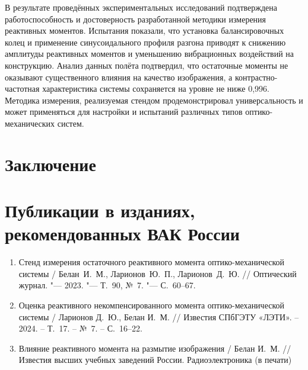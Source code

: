 В результате проведённых экспериментальных исследований подтверждена работоспособность и достоверность разработанной методики измерения реактивных моментов.
Испытания показали, что установка балансировочных колец и применение синусоидального профиля разгона приводят к снижению амплитуды реактивных моментов и уменьшению вибрационных воздействий на конструкцию.
Анализ данных полёта подтвердил, что остаточные моменты не оказывают существенного влияния на качество изображения, а контрастно-частотная характеристика системы сохраняется на уровне не ниже 0,996.
Методика измерения, реализуемая стендом продемонстрировал универсальность и может применяться для настройки и испытаний различных типов оптико-механических систем.



\section*{Заключение}



\section*{Публикации в изданиях, рекомендованных ВАК России}
\begin{enumerate}
\item  Стенд измерения остаточного реактивного момента оптико-механической системы / Белан~И.~М., Ларионов~Ю.~П., Ларионов~Д.~Ю.  // Оптический журнал. "--- 2023. "--- Т.~90, №~7. "--- С.~60--67.

\item Оценка реактивного некомпенсированного момента оптико-механической системы / Ларионов Д.~Ю., Белан И.~М. // Известия СПбГЭТУ «ЛЭТИ». – 2024. – Т.~17. – №~7. – С.~16--22.

\item Влияние реактивного момента на размытие изображения / Белан И.~М. //  Известия высших учебных заведений России. Радиоэлектроника (в печати)




\end{enumerate}

